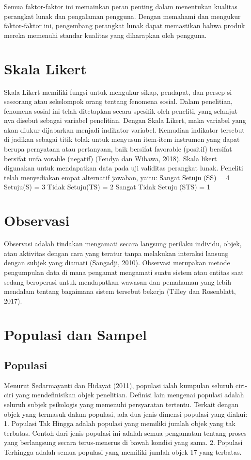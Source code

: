 Semua faktor-faktor ini memainkan peran penting dalam menentukan kualitas perangkat lunak dan pengalaman pengguna. Dengan memahami dan mengukur faktor-faktor ini, pengembang perangkat lunak dapat memastikan bahwa produk mereka memenuhi standar kualitas yang diharapkan oleh pengguna.

\section{Skala Likert}
Skala Likert memiliki fungsi untuk mengukur sikap, pendapat, dan persep si seseorang atau sekelompok orang tentang fenomena sosial. Dalam penelitian, fenomena sosial ini telah ditetapkan secara spesifik oleh peneliti, yang selanjut nya disebut sebagai variabel penelitian. Dengan Skala Likert, maka variabel yang akan diukur dijabarkan menjadi indikator variabel. Kemudian indikator tersebut di jadikan sebagai titik tolak untuk menyusun item-item instrumen yang dapat berupa pernyataan atau pertanyaan, baik bersifat favorable (positif) bersifat bersifat unfa vorable (negatif) (Fendya dan Wibawa, 2018). Skala likert digunakan untuk mendapatkan data pada uji validitas perangkat lunak. Peneliti telah menyediakan empat alternatif jawaban, yaitu: Sangat Setuju (SS) = 4 Setuju(S) = 3 Tidak Setuju(TS) = 2 Sangat Tidak Setuju (STS) = 1

\section{Observasi}
Observasi adalah tindakan mengamati secara langsung perilaku individu, objek, atau aktivitas dengan cara yang teratur tanpa melakukan interaksi lansung dengan subjek yang diamati (Sangadji, 2010). Observasi merupakan metode pengumpulan data di mana pengamat mengamati suatu sistem atau entitas saat sedang beroperasi untuk mendapatkan wawasan dan pemahaman yang lebih mendalam tentang bagaimana sistem tersebut bekerja (Tilley dan Rosenblatt, 2017).

\section{Populasi dan Sampel}
\subsection{Populasi}
Menurut Sedarmayanti dan Hidayat (2011), populasi ialah kumpulan seluruh ciri-ciri yang mendefinisikan objek penelitian. Definisi lain mengenai populasi adalah seluruh subjek psikologis yang memenuhi persyaratan tertentu. Terkait dengan objek yang termasuk dalam populasi, ada dua jenis dimensi populasi yang diakui: 1. Populasi Tak Hingga adalah populasi yang memiliki jumlah objek yang tak terbatas. Contoh dari jenis populasi ini adalah semua pengamatan tentang proses yang berlangsung secara terus-menerus di bawah kondisi yang sama. 2. Populasi Terhingga adalah semua populasi yang memiliki jumlah objek 17 yang terbatas.
